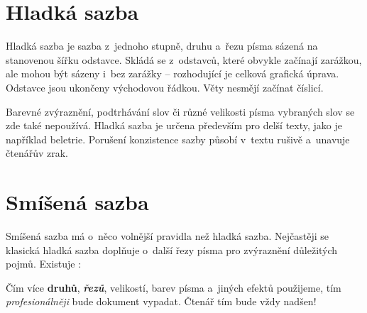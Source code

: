 \documentclass[a4paper, 11pt, twocolumn]{article}
\begin{document}

	\section{Hladká sazba}

	Hladká sazba je sazba z~jednoho stupně, druhu a~řezu písma sázená na stanovenou šířku odstavce. Skládá se z~odstavců,
	které obvykle začínají zarážkou, ale mohou být sázeny i~bez zarážky -- rozhodující je celková grafická úprava. Odstavce
	jsou ukončeny východovou řádkou. Věty nesmějí začínat číslicí.

	Barevné zvýraznění, podtrhávání slov či různé velikosti písma vybraných slov se zde také nepoužívá. Hladká sazba je určena
	především pro delší texty, jako je například beletrie. Porušení konzistence sazby působí v~textu rušivě a~unavuje čtenářův zrak.

	\section{Smíšená sazba}

	Smíšená sazba má o~něco volnější pravidla než hladká sazba. Nejčastěji se klasická hladká sazba doplňuje o~další řezy písma
	pro zvýraznění důležitých pojmů. Existuje :

	\begin{adjustwidth}{0.77cm}{0.80cm}
		\medskip
		\setlength{\parindent}{0.5cm}
		\hspace{\parindent}
		Čím více \textbf{druhů}, \textbf{\emph{řezů}}, {\scriptsize velikostí}, barev pí\-sma a~jiných efektů použijeme,
		tím \emph{profesionálněji} bude dokument vypadat. Čtenář tím bude vždy {\Huge nadšen!}
		\medskip
	\end{adjustwidth}
\end{document}
